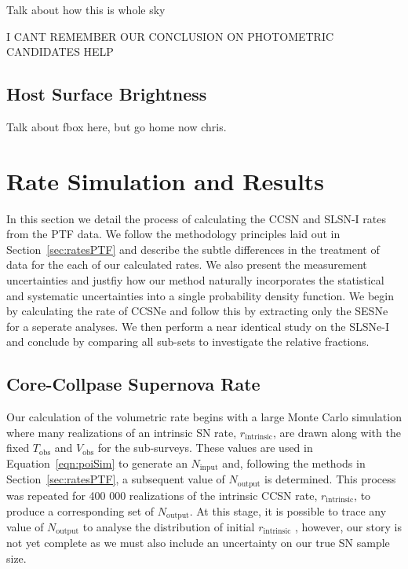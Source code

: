 \documentclass[a4paper,fleqn,usenatbib]{mnras}
\newcommand{\chris}[1]{\color{orange}#1\color{black}}
\begin{document}
Talk about how this is whole sky

\chris{I CANT REMEMBER OUR CONCLUSION ON PHOTOMETRIC CANDIDATES HELP}

\subsection{Host Surface Brightness}
\label{sec:fox_distribution}

Talk about fbox here, but go home now chris.


\section{Rate Simulation and Results}
\label{sec:rate_sim}

In this section we detail the process of calculating the CCSN and SLSN-I rates from the PTF data. We follow the methodology principles laid out in Section~\ref{sec:ratesPTF} and describe the subtle differences in the treatment of data for the each of our calculated rates. We also present the measurement uncertainties and justfiy how our method naturally incorporates the statistical and systematic uncertainties into a single probability density function. We begin by calculating the rate of CCSNe and follow this by extracting only the SESNe for a seperate analyses. We then perform a near identical study on the SLSNe-I and conclude by comparing all sub-sets to investigate the relative fractions.

\subsection{Core-Collpase Supernova Rate}
\label{sec:CCSN_Rate}

Our calculation of the volumetric rate begins with a large Monte Carlo simulation where many realizations of an intrinsic SN rate, $r_\mathrm{intrinsic}$, are drawn along with the fixed $T_\mathrm{obs}$ and $V_\mathrm{obs}$ for the sub-surveys. These values are used in Equation~\ref{eqn:poiSim} to generate an $N_\mathrm{input}$ and, following the methods in Section~\ref{sec:ratesPTF}, a subsequent value of $N_\mathrm{output}$ is determined. This process was repeated for 400 000 realizations of the intrinsic CCSN rate, $r_\mathrm{intrinsic}$, to produce a corresponding set of $N_\mathrm{output}$. At this stage, it is possible to trace any value of $N_\mathrm{output}$ to analyse the distribution of initial $r_\mathrm{intrinsic}$ \citep[e.g.][]{Prajs2016}, however, our story is not yet complete as we must also include an uncertainty on our true SN sample size.
\end{document}
